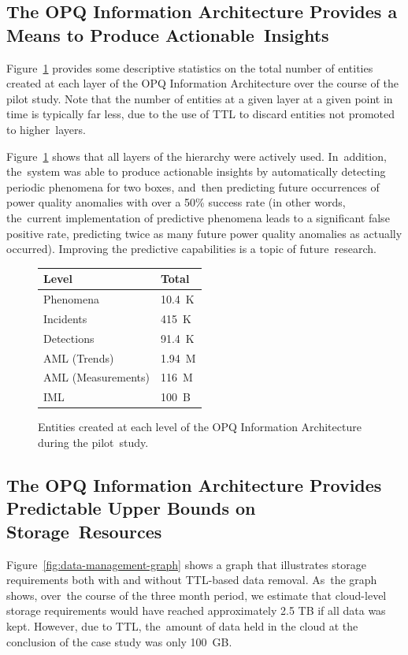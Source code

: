 \documentclass[energies,article,accept,moreauthors,pdftex]{Definitions/mdpi}
\begin{document}
\subsection{The OPQ Information Architecture Provides a Means to Produce Actionable~Insights}
\label{hyp:04}

Figure~\ref{fig:level-statistics} provides some descriptive statistics on the total number of entities created at each layer of the OPQ Information Architecture over the course of the pilot study. Note that the number of entities at a given layer at a given point in time is typically far less, due to the use of TTL to discard entities not promoted to higher~layers.


Figure~\ref{fig:level-statistics} shows that all layers of the hierarchy were actively used. In~addition, the~system was able to produce actionable insights by automatically detecting periodic phenomena for two boxes, and~then predicting future occurrences of power quality anomalies with over a 50\% success rate (in other words, the~current implementation of predictive phenomena leads to a significant false positive rate, predicting twice as many future power quality anomalies as actually occurred). Improving the predictive capabilities is a topic of future~research.


\begin{figure}[H]
\centering
\begin{tabularx}{.4\textwidth}{lX}
\toprule
\textbf{Level} & \textbf{Total} \\
\midrule
Phenomena & 10.4~K \\
Incidents & 415~K \\
Detections & 91.4~K \\
AML (Trends) & 1.94~M \\
AML (Measurements) & 116~M \\
IML & 100~B \\
\bottomrule
\end{tabularx}
\caption{Entities created at each level of the OPQ Information Architecture during the pilot~study.}
\label{fig:level-statistics}
\end{figure}

\subsection{The OPQ Information Architecture Provides Predictable Upper Bounds on Storage~Resources}
\label{hyp:05}

Figure~\ref{fig:data-management-graph} shows a graph that illustrates storage requirements both with and without TTL-based data removal. As~the graph shows, over~the course of the three month period, we estimate that cloud-level storage requirements would have reached approximately 2.5 TB if all data was kept. However, due to TTL, the~amount of data held in the cloud at the conclusion of the case study was only 100~GB.
\end{document}

